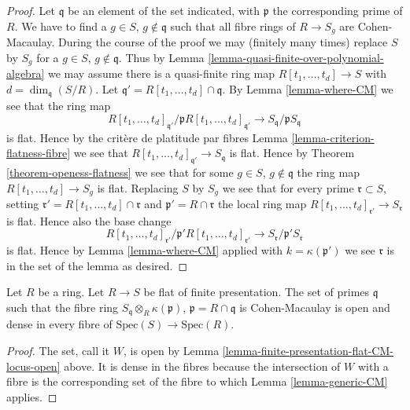 \begin{proof}
Let $\mathfrak q$ be an element of the set indicated, with
$\mathfrak p$ the corresponding prime of $R$.
We have to find a $g \in S$, $g \not \in \mathfrak q$ such that
all fibre rings of $R \to S_g$ are Cohen-Macaulay.
During the course of the proof we may (finitely many times)
replace $S$ by $S_g$ for a $g \in S$, $g \not \in \mathfrak q$.
Thus by Lemma \ref{lemma-quasi-finite-over-polynomial-algebra}
we may assume there is a quasi-finite ring map
$R[t_1, \ldots, t_d] \to S$ with $d = \dim_{\mathfrak q}(S/R)$.
Let $\mathfrak q' = R[t_1, \ldots, t_d] \cap \mathfrak q$.
By Lemma \ref{lemma-where-CM} we see that the ring map
$$
R[t_1, \ldots, t_d]_{\mathfrak q'} /
\mathfrak p R[t_1, \ldots, t_d]_{\mathfrak q'}
\longrightarrow
S_{\mathfrak q}/\mathfrak p S_{\mathfrak q}
$$
is flat. Hence by the crit\`ere de platitude par fibres
Lemma \ref{lemma-criterion-flatness-fibre} we see that
$R[t_1, \ldots, t_d]_{\mathfrak q'} \to S_{\mathfrak q}$ is flat.
Hence by Theorem \ref{theorem-openess-flatness} we see that
for some $g \in S$, $g \not \in \mathfrak q$ the ring map
$R[t_1, \ldots, t_d] \to S_g$ is flat. Replacing $S$ by $S_g$
we see that for every prime $\mathfrak r \subset S$,
setting $\mathfrak r' = R[t_1, \ldots, t_d] \cap \mathfrak r$
and $\mathfrak p' = R \cap \mathfrak r$
the local ring map
$R[t_1, \ldots, t_d]_{\mathfrak r'} \to S_{\mathfrak r}$ is flat.
Hence also the base change
$$
R[t_1, \ldots, t_d]_{\mathfrak r'} /
\mathfrak p' R[t_1, \ldots, t_d]_{\mathfrak r'}
\longrightarrow
S_{\mathfrak r}/\mathfrak p' S_{\mathfrak r}
$$
is flat. Hence by Lemma \ref{lemma-where-CM} applied with
$k = \kappa(\mathfrak p')$ we see
$\mathfrak r$ is in the set of the lemma
as desired.
\end{proof}

\begin{lemma}
\label{lemma-generic-CM-flat-finite-presentation}
Let $R$ be a ring. Let $R \to S$ be flat of finite presentation.
The set of primes $\mathfrak q$ such that the fibre ring
$S_{\mathfrak q} \otimes_R \kappa(\mathfrak p)$,
$\mathfrak p = R \cap \mathfrak q$ is Cohen-Macaulay
is open and dense in every fibre of $\text{Spec}(S) \to \text{Spec}(R)$.
\end{lemma}

\begin{proof}
The set, call it $W$, is open by
Lemma \ref{lemma-finite-presentation-flat-CM-locus-open} above.
It is dense in the fibres because the intersection of $W$
with a fibre is the corresponding set of the fibre
to which Lemma \ref{lemma-generic-CM} applies.
\end{proof}

